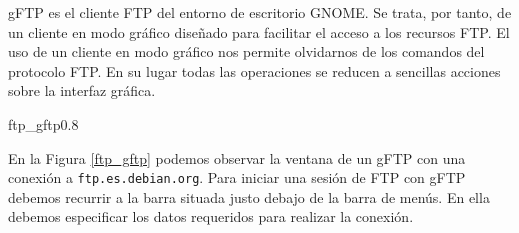 {\sf gFTP} es el cliente FTP del entorno de escritorio {\sf GNOME}. Se
trata,  por  tanto,  de  un  cliente en  modo  gráfico  diseñado  para
facilitar el acceso a  los recursos FTP. El uso de  un cliente en modo
gráfico nos permite  olvidarnos de los comandos del  protocolo FTP. En
su lugar todas  las operaciones se reducen a  sencillas acciones sobre
la interfaz gráfica.

\begin{figura}{ftp_gftp}{0.8}
\caption{Ventana de gFTP en una conexión a {\tt ftp.es.debian.org}}
\label{ftp_gftp}
\end{figura}

En la  Figura \ref{ftp_gftp}  podemos observar la  ventana de  un {\sf
gFTP} con  una conexión  a {\tt  ftp.es.debian.org}. Para  iniciar una
sesión de FTP con {\sf gFTP} debemos recurrir a la barra situada justo
debajo de  la barra de  menús. En  ella debemos especificar  los datos
requeridos para realizar la conexión.

